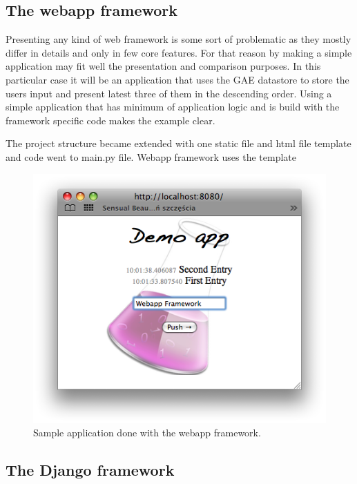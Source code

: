 \subsection{The webapp framework}\label{subsec:webapp}
Presenting any kind of web framework is some sort of problematic as they mostly differ in details and only in few core features. For that reason by making a simple application may fit well the presentation and comparison purposes. In this particular case it will be an application that uses the GAE datastore to store the users input and present latest three of them in the descending order. Using a simple application that has minimum of application logic and is build with the framework specific code makes the example clear. 

The project structure became extended with one static file and html file template and code went to main.py file. Webapp framework uses the template

\newpage


\begin{figure}[ht]
\begin{center}
\includegraphics[scale=0.6]{img/webapp_sample.png}
\caption{Sample application done with the webapp framework.}
\label{fig:webapp_sample}
\end{center}
\end{figure}

\subsection{The Django framework}\label{subsec:django}